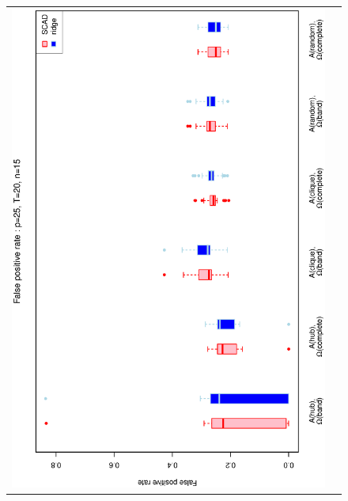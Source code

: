 \begin{figure}[h!]
\centering
\begin{tabular}{cc}
\includegraphics[scale=0.45,angle=270]{ROCfpr25T20N15_25.eps}
\\

\end{tabular}
\end{figure}
